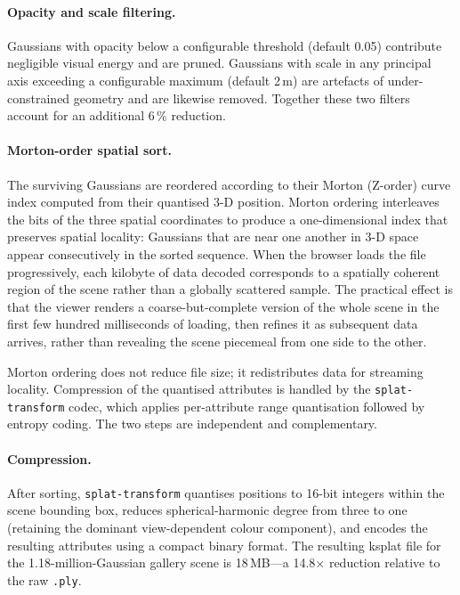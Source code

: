 \paragraph{Opacity and scale filtering.}
Gaussians with opacity below a configurable threshold (default 0.05) contribute
negligible visual energy and are pruned. Gaussians with scale in any principal axis
exceeding a configurable maximum (default 2\,m) are artefacts of under-constrained
geometry and are likewise removed. Together these two filters account for an
additional 6\,\% reduction.

\paragraph{Morton-order spatial sort.}
The surviving Gaussians are reordered according to their Morton (Z-order) curve
index computed from their quantised 3-D position. Morton ordering interleaves the
bits of the three spatial coordinates to produce a one-dimensional index that
preserves spatial locality: Gaussians that are near one another in 3-D space appear
consecutively in the sorted sequence. When the browser loads the file progressively,
each kilobyte of data decoded corresponds to a spatially coherent region of the
scene rather than a globally scattered sample. The practical effect is that the
viewer renders a coarse-but-complete version of the whole scene in the first few
hundred milliseconds of loading, then refines it as subsequent data arrives,
rather than revealing the scene piecemeal from one side to the other.

\begin{technote}
Morton ordering does not reduce file size; it redistributes data for streaming
locality. Compression of the quantised attributes is handled by the
\texttt{splat-transform} codec, which applies per-attribute range quantisation
followed by entropy coding. The two steps are independent and complementary.
\end{technote}

\paragraph{Compression.}
After sorting, \texttt{splat-transform} quantises positions to 16-bit integers
within the scene bounding box, reduces spherical-harmonic degree from three to
one (retaining the dominant view-dependent colour component), and encodes the
resulting attributes using a compact binary format. The resulting \acrshort{ksplat}
file for the 1.18-million-Gaussian gallery scene is 18\,MB---a 14.8$\times$ reduction
relative to the raw \texttt{.ply}.

